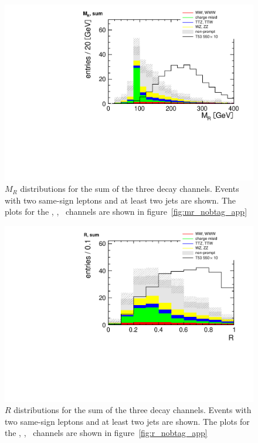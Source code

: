 \begin{figure}[htb]
    \centering
    \includegraphics[width=\textwidth]{images/pdf/mr_sum_0}
    \caption{$M_R$ distributions for the sum of the three decay channels. Events with two same-sign leptons and at least
two jets are shown. The plots for the \E\E, \E\M, \M\M\ channels are
shown in figure~\ref{fig:mr_nobtag_app}}
    \label{fig:mr_nobtag}
\end{figure}

\begin{figure}[htb]
    \centering
    \includegraphics[width=\textwidth]{images/pdf/r_sum_0}
    \caption{$R$ distributions for the sum of the three decay channels. Events with two same-sign leptons and at least
two jets are shown. The plots for the \E\E, \E\M, \M\M\ channels are
shown in figure~\ref{fig:r_nobtag_app}}
    \label{fig:r_nobtag}
\end{figure}

